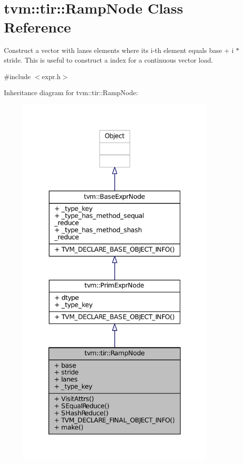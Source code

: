 \hypertarget{classtvm_1_1tir_1_1RampNode}{}\section{tvm\+:\+:tir\+:\+:Ramp\+Node Class Reference}
\label{classtvm_1_1tir_1_1RampNode}


Construct a vector with lanes elements where its i-\/th element equals base + i $\ast$ stride. This is useful to construct a index for a continuous vector load.  




{\ttfamily \#include $<$expr.\+h$>$}



Inheritance diagram for tvm\+:\+:tir\+:\+:Ramp\+Node\+:
\nopagebreak
\begin{figure}[H]
\begin{center}
\leavevmode
\includegraphics[height=550pt]{classtvm_1_1tir_1_1RampNode__inherit__graph}
\end{center}
\end{figure}


